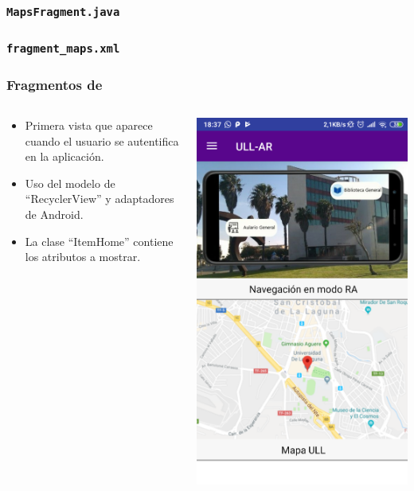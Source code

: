 \begin{frame}
	\frametitle{\texttt{MapsFragment.java}}
	
\end{frame}



\begin{frame}
	\frametitle{\texttt{fragment\_maps.xml}}
	
\end{frame}

\begin{frame}
	\frametitle{Fragmentos de \ULLAR{}}
	\begin{columns}
		\begin{column}{0.6\textwidth}
			\begin{itemize}
				\item Primera vista que aparece cuando el usuario se autentifica en la aplicación.
				\item Uso del modelo de ``RecyclerView'' y adaptadores de Android.
				\item La clase ``ItemHome'' contiene los atributos a mostrar.
			\end{itemize}
			\endblock{}
		\end{column}
		\begin{column}{0.4\textwidth} 
			\vfill 
			\begin{center}
				\includegraphics[width=0.8\linewidth]{Images/homeApp}
			\end{center}
		\end{column}
	\end{columns}
\end{frame}

